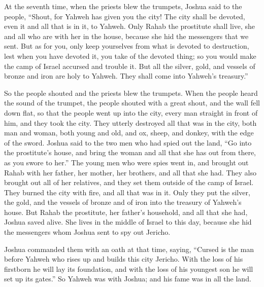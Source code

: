 {At the seventh time, when the priests blew the trumpets, Joshua said to the people, “Shout, for Yahweh has given you the city!
The city shall be devoted, even it and all that is in it, to Yahweh. Only Rahab the prostitute shall live, she and all who are with her in the house, because she hid the messengers that we sent.
But as for you, only keep yourselves from what is devoted to destruction, lest when you have devoted it, you take of the devoted thing; so you would make the camp of Israel accursed and trouble it.
But all the silver, gold, and vessels of bronze and iron are holy to Yahweh. They shall come into Yahweh’s treasury.”
\par }{\PP {}So the people shouted and the priests blew the trumpets. When the people heard the sound of the trumpet, the people shouted with a great shout, and the wall fell down flat, so that the people went up into the city, every man straight in front of him, and they took the city.
They utterly destroyed all that was in the city, both man and woman, both young and old, and ox, sheep, and donkey, with the edge of the sword.
Joshua said to the two men who had spied out the land, “Go into the prostitute’s house, and bring the woman and all that she has out from there, as you swore to her.”
The young men who were spies went in, and brought out Rahab with her father, her mother, her brothers, and all that she had. They also brought out all of her relatives, and they set them outside of the camp of Israel.
They burned the city with fire, and all that was in it. Only they put the silver, the gold, and the vessels of bronze and of iron into the treasury of Yahweh’s house.
But Rahab the prostitute, her father’s household, and all that she had, Joshua saved alive. She lives in the middle of Israel to this day, because she hid the messengers whom Joshua sent to spy out Jericho.
\par }{\PP {}Joshua commanded them with an oath at that time, saying, “Cursed is the man before Yahweh who rises up and builds this city Jericho. With the loss of his firstborn he will lay its foundation, and with the loss of his youngest son he will set up its gates.”
So Yahweh was with Joshua; and his fame was in all the land.

}
